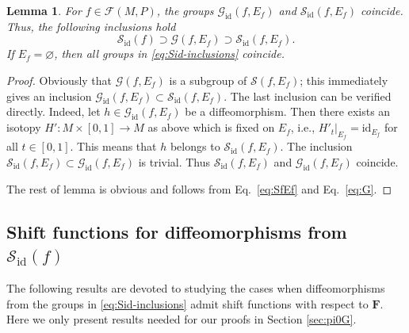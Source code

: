 \documentclass[10pt,reqno]{amsart}
\newtheorem{lemma}[subsection]{Lemma}
\newcommand{\bfF}{\mathbf{F}}
\newcommand{\Sid}{\mathcal{S}_{\id}(f)}
\newcommand{\F}{\mathcal{F}(M,P)}
\newcommand{\id}{\mathrm{id}}
\begin{document}
{
\begin{lemma}\label{lm:inclusions-stab}
	For $f\in \F$, the groups  $\mathcal{G}_{\id}(f,E_f) $ and $\mathcal{S}_{\id}(f,E_f)$ coincide. Thus, the following inclusions hold
	\begin{equation}\label{eq:Sid-inclusions}
		\Sid\supset \mathcal{G}(f,E_f)\supset \mathcal{S}_{\id}(f,E_f).
	\end{equation}
	If $E_f = \varnothing$, then all  groups in \eqref{eq:Sid-inclusions} coincide.
\end{lemma}
\begin{proof}
Obviously that  $\mathcal{G}(f,E_f)$ is a subgroup of $\mathcal{S}(f,E_f)$; this immediately gives an inclusion $\mathcal{G}_{\id}(f,E_f)\subset \mathcal{S}_{\id}(f,E_f)$.  The last inclusion can be verified directly. Indeed, 
let $h\in\mathcal{G}_{\id}(f,E_f)$ be a diffeomorphism. Then there exists an isotopy $H':M\times[0,1]\to M$ as above which is fixed on $E_f$, i.e., $H'_t|_{E_f} = \id_{E_f}$ for all $t\in[0,1]$. 
This means that  $h$ belongs to $\mathcal{S}_{\id}(f,E_f)$. The inclusion $\mathcal{S}_{\id}(f,E_f)\subset \mathcal{G}_{\id}(f,E_f)$ is trivial. Thus $\mathcal{S}_{\id}(f,E_f)$ and $\mathcal{G}_{\id}(f,E_f)$ coincide.


	The rest of lemma is obvious and follows from Eq.~\eqref{eq:SfEf} and Eq.~\eqref{eq:G}.
\end{proof}
}





\subsection{Shift functions for diffeomorphisms from $\Sid$}
The following results are devoted to studying the cases when diffeomorphisms from the groups  in \eqref{eq:Sid-inclusions}  admit shift functions with respect to $\bfF$.
Here we only present  results needed for our proofs in Section \ref{sec:pi0G}.
\end{document}
